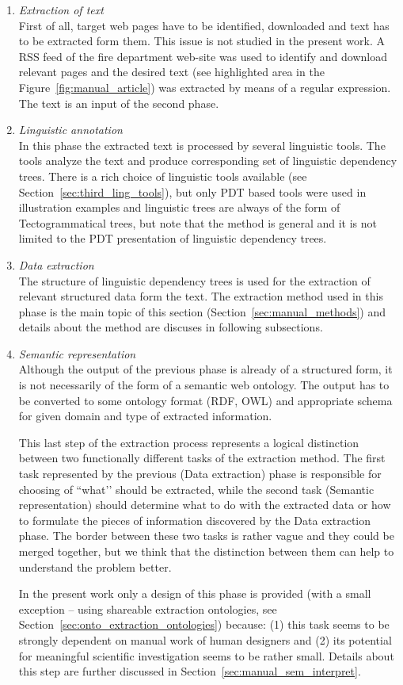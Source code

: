 \begin{enumerate}
\item \emph{Extraction of text} \\ First of all, target web pages have to be identified, downloaded and text has to be extracted form them. This issue is not studied in the present work. A RSS feed of the fire department web-site was used to identify and download relevant pages and the desired text (see highlighted area in the Figure~\ref{fig:manual_article}) was extracted by means of a regular expression. The text is an input of the second phase.

\item \emph{Linguistic annotation} \\ In this phase the extracted text is processed by several linguistic tools. The tools analyze the text and produce corresponding set of linguistic dependency trees. There is a rich choice of linguistic tools available (see Section~\ref{sec:third_ling_tools}), but only PDT based tools were used in illustration examples and linguistic trees are always of the form of Tectogrammatical trees, but note that the method is general and it is not limited to the PDT presentation of linguistic dependency trees.

\item \emph{Data extraction} \\ The structure of linguistic dependency trees is used for the extraction of relevant structured data form the text. The extraction method used in this phase is the main topic of this section (Section~\ref{sec:manual_methods}) and details about the method are discuses in following subsections.

\item \emph{Semantic representation} \\ Although the output of the previous phase is already of a structured form, it is not necessarily of the form of a semantic web ontology. The output has to be converted to some ontology format (RDF, OWL) and appropriate schema for given domain and type of extracted information. 

This last step of the extraction process represents a logical distinction between two functionally different tasks of the extraction method. The first task represented by the previous (Data extraction) phase is responsible for choosing of ``what’’ should be extracted, while the second task (Semantic representation) should determine what to do with the extracted data or how to formulate the pieces of information discovered by the Data extraction phase. The border between these two tasks is rather vague and they could be merged together, but we think that the distinction between them can help to understand the problem better.


In the present work only a design of this phase is provided (with a small exception -- using shareable extraction ontologies, see Section~\ref{sec:onto_extraction_ontologies}) because: (1) this task seems to be strongly dependent on manual work of human designers and (2) its potential for meaningful scientific investigation seems to be rather small. Details about this step are further discussed in Section~\ref{sec:manual_sem_interpret}.
\end{enumerate}

